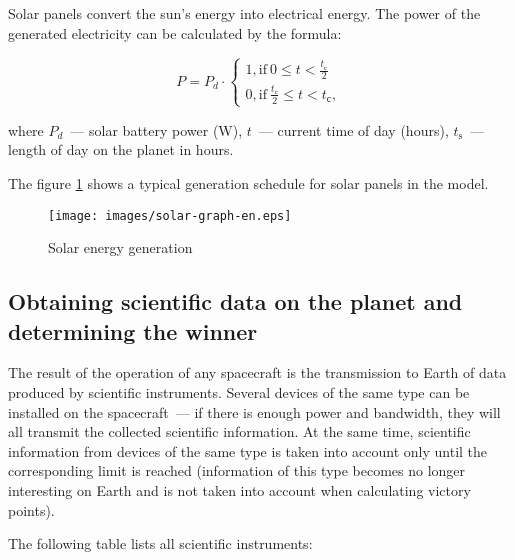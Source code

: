 \documentclass[12pt,a4paper]{article}
\begin{document}
Solar panels convert the sun's energy into electrical energy. The power of the generated electricity can be calculated by the formula:

$$
P = P_d \cdot \left\{
  \begin{array}{c}
    1, \text{if}~0 \leqslant t < \frac{t_{\text{с}}}{2}\\
    0, \text{if}~\frac{t_{\text{с}}}{2} \leqslant t < t_{\text{с}},
  \end{array}
\right.
$$

where $P_d$~--- solar battery power (W), $t$~--- current time of day (hours), $t_{\text{s}}$~--- length of day on the planet in hours.

The figure \ref{Pic:solar} shows a typical generation schedule for solar panels in the model.

\begin{figure}[tbh]
  \begin{center}
    \texttt{[image: images/solar-graph-en.eps]}
    \caption{Solar energy generation}
    \label{Pic:solar}
  \end{center}
\end{figure}

\subsection{Obtaining scientific data on the planet and determining the winner}

The result of the operation of any spacecraft is the transmission to Earth of data produced by scientific instruments. Several devices of the same type can be installed on the spacecraft~--- if there is enough power and bandwidth, they will all transmit the collected scientific information. At the same time, scientific information from devices of the same type is taken into account only until the corresponding limit is reached (information of this type becomes no longer interesting on Earth and is not taken into account when calculating victory points).

The following table lists all scientific instruments:
\end{document}
